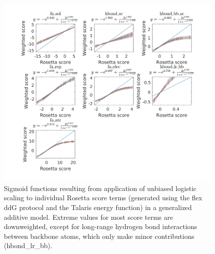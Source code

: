 \documentclass[journal=jpcbfk,manuscript=suppinfo]{achemso}
\begin{document}
\begin{figure}
  \centering
  \includegraphics[width=\textwidth,keepaspectratio]{figures/zemu-sigmoid2-tal-feats.png}
  \caption[Sigmoid fit Rosetta score function terms]{
    Sigmoid functions resulting from application of unbiased logistic scaling to individual Rosetta score terms (generated using the flex ddG protocol and the Talaris energy function\cite{song_structure-guided_2011,shapovalov_smoothed_2011,omeara_combined_2015}) in a generalized additive model. Extreme values for most score terms are downweighted, except for long-range hydrogen bond interactions between backbone atoms, which only make minor contributions (hbond\_lr\_bb). %
  } \label{fig:t14-fits-feats}
\end{figure}
\end{document}

